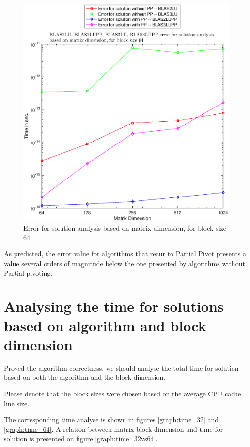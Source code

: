 \documentclass[conference,compsoc]{IEEEtran}
\begin{document}
     \begin{figure}[H]
     \centering
     \includegraphics[width=1\columnwidth]{EPS/error_64.eps}
     \caption{Error for solution analysis based on matrix dimension, for block size 64}
     \label{graph:error_64}
     \end{figure}
     
     
     As predicted, the error value for algorithms that recur to Partial Pivot presents a value several orders of magnitude below the one presented by algorithms without Partial pivoting.
     
\section{Analysing the time for solutions based on algorithm and block dimension}  

Proved the algorithm correctness, we should analyse the total time for solution based on both the algorithm and the block dimension.\par 
Please denote that the block sizes were chosen based on the average CPU cache line size. \par The corresponding time analyse is shown in figures \ref{graph:time_32} and \ref{graph:time_64}. A relation between matrix block dimension and time for solution is presented on figure \ref{graph:time_32vs64}.
\end{document}
